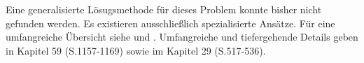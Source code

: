 
Eine generalisierte Lösugsmethode für dieses Problem konnte bisher nicht gefunden werden. Es existieren ausschließlich spezialisierte Ansätze. 
Für eine umfangreiche Übersicht siehe \cite[S.104]{waller_applied_2004} und \cite[S. 150]{haining_spatial_2003}.
Umfangreiche und tiefergehende Details geben \cite{fischer_handbook_2014} in Kapitel 59 (S.1157-1169)
sowie \cite{gelfand_handbook_2010} im Kapitel 29 (S.517-536).


% 


